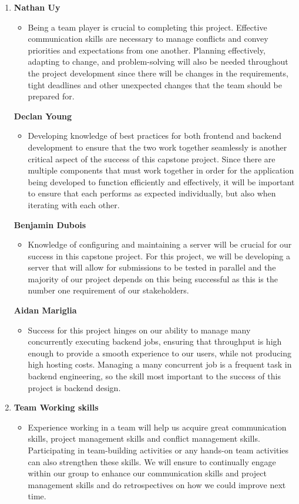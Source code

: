 \documentclass[12pt]{article}
\begin{document}
\begin{enumerate}
  \item \textbf{Nathan Uy}
\begin{itemize}
    \item Being a team player is crucial to completing this project. Effective communication skills are necessary to manage conflicts and convey priorities and expectations from one another. Planning effectively, adapting to change, and problem-solving will also be needed throughout the project development since there will be changes in the requirements, tight deadlines and other unexpected changes that the team should be prepared for.
\end{itemize} 
\textbf{Declan Young}
\begin{itemize}
    \item Developing knowledge of best practices for both frontend and backend development to ensure that the two work together seamlessly is another critical aspect of the success of this capstone project. Since there are multiple components that must work together in order for the application being developed to function efficiently and effectively, it will be important to ensure that each performs as expected individually, but also when iterating with each other. 
\end{itemize} 
\textbf{Benjamin Dubois}
\begin{itemize}
    \item Knowledge of configuring and maintaining a server will be crucial for our success in this capstone project. For this project, we will be developing a server that will allow for submissions to be tested in parallel and the majority of our project depends on this being successful as this is the number one requirement of our stakeholders.
\end{itemize}
\textbf{Aidan Mariglia}
\begin{itemize}
    \item Success for this project hinges on our ability to manage many concurrently executing backend jobs, ensuring that throughput is high enough to provide a smooth experience to our users, while not producing high hosting costs. Managing a many concurrent job is a frequent task in backend engineering, so the skill most important to the success of this project is backend design.
\end{itemize}
\item \textbf{Team Working skills}
\begin{itemize}
\item Experience working in a team will help us acquire great communication skills, project management skills and conflict management skills. Participating in team-building activities or any hands-on team activities can also strengthen these skills. We will ensure to continually engage within our group to enhance our communication skills and project management skills and do retrospectives on how we could improve next time.

\end{itemize}
\end{enumerate}
\end{document}
